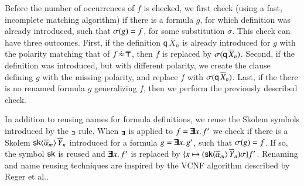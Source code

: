 Before the number of occurrences of $f$ is checked, we first check (using a fast, incomplete matching algorithm) if there is a
formula $g$, for which definition was already introduced, such that $\sigma(g) =
f$, for some substitution $\sigma$. This check can have three outcomes. First, if
the definition $\textsf{q} \, \overline{X}_n$ is already introduced for $g$ with the
polarity matching that of $f \, \dot{\approx} \, \pmb{\top}$, then $f$ is
replaced by $\sigma(\mathsf{q} \, \overline{X}_{n})$. Second, if the definition was introduced,
but with different polarity, we create the clause defining $g$ with the missing
polarity, and replace $f$ with $\sigma(\mathsf{q} \, \overline{X}_{n})$. Last, if the there is no renamed
formula $g$ generalizing $f$, then we perform the previously described check.

In addition to reusing names for formula definitions, we reuse the Skolem
symbols introduced by the $_{\pmb{\exists}}$ rule. When
$_{\pmb{\exists}}$ is applied to $f = \pmb{\exists} x.\, f'$ we check if there is
a Skolem $\mathsf{sk}{\langle\overline{\alpha}_{m}\rangle} \, \overline{Y}_{n}$ introduced for a
formula $g = \pmb{\exists} x.\, g'$, such that $\sigma(g) = f$. If so, the symbol
$\mathsf{sk}$ is reused and $\pmb{\exists} x.\, f'$ is replaced by $\{x \mapsto
(\mathsf{sk}{\langle\overline{\alpha}_{m}\rangle} \, \overline{Y}_{n})\sigma \}f'$. Renaming and
name reusing techniques are inspired by the VCNF algorithm described by Reger et
al.\cite{rsv-16-vcnf}.





